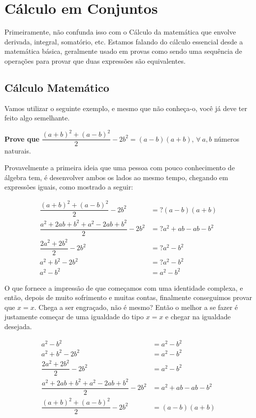 \section{Cálculo em Conjuntos}
Primeiramente, não confunda isso com o Cálculo da matemática que envolve derivada, integral, somatório, etc. Estamos falando do cálculo essencial desde a matemática básica, geralmente usado em provas como sendo uma sequência de operações para provar que duas expressões são equivalentes.

  \subsection{Cálculo Matemático}
  Vamos utilizar o seguinte exemplo, e mesmo que não conheça-o, você já deve ter feito algo semelhante.

  \textbf{Prove que} $\dfrac{(a+b)^2+(a-b)^2}{2}-2b^2 = (a-b)(a+b)$, $\forall\ a,b$ números naturais. 

  Provavelmente a primeira ideia que uma pessoa com pouco conhecimento de álgebra tem, é desenvolver ambos os lados ao mesmo tempo, chegando em expressões iguais, como mostrado a seguir:

  \begin{equation*}
    \begin{aligned}
      \dfrac{(a+b)^2+(a-b)^2}{2}-2b^2 &=? (a-b)(a+b)\\
      \dfrac{a^2+2ab+b^2+a^2-2ab+b^2}{2}-2b^2 &=? a^2+ab-ab-b^2\\
      \dfrac{2a^2+2b^2}{2}-2b^2 &=? a^2-b^2\\
      a^2+b^2-2b^2 &=? a^2-b^2\\
      a^2-b^2 &= a^2-b^2
    \end{aligned}
  \end{equation*}

  O que fornece a impressão de que começamos com uma identidade complexa, e então, depois de muito sofrimento e muitas contas, finalmente conseguimos provar que $x=x$. Chega a ser engraçado, não é mesmo?
  Então o melhor a se fazer é justamente começar de uma igualdade do tipo $x=x$ e chegar na igualdade desejada.

  \begin{equation*}
    \begin{aligned}
      a^2-b^2 &= a^2-b^2\\
      a^2+b^2-2b^2 &= a^2-b^2\\
      \dfrac{2a^2+2b^2}{2}-2b^2 &= a^2-b^2\\
      \dfrac{a^2+2ab+b^2+a^2-2ab+b^2}{2}-2b^2 &= a^2+ab-ab-b^2\\
      \dfrac{(a+b)^2+(a-b)^2}{2}-2b^2 &= (a-b)(a+b)
    \end{aligned}
  \end{equation*}

